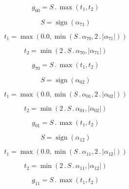 \documentclass{article}
\begin{document}
\begin{dmath}g_{60} = S \,.\, \max\left(t_{1}, t_{2}\right)\end{dmath}

\begin{dmath}S = \operatorname{sign}{\left (\alpha_{71} \right )}\end{dmath}

\begin{dmath}t_{1} = \max\left(0.0, \min\left(S \,.\, \alpha_{70}, 2 \,.\, \left|{\alpha_{71}}\right|\right)\right)\end{dmath}

\begin{dmath}t_{2} = \min\left(2 \,.\, S \,.\, \alpha_{70}, \left|{\alpha_{71}}\right|\right)\end{dmath}

\begin{dmath}g_{70} = S \,.\, \max\left(t_{1}, t_{2}\right)\end{dmath}

\begin{dmath}S = \operatorname{sign}{\left (\alpha_{02} \right )}\end{dmath}

\begin{dmath}t_{1} = \max\left(0.0, \min\left(S \,.\, \alpha_{01}, 2 \,.\, \left|{\alpha_{02}}\right|\right)\right)\end{dmath}

\begin{dmath}t_{2} = \min\left(2 \,.\, S \,.\, \alpha_{01}, \left|{\alpha_{02}}\right|\right)\end{dmath}

\begin{dmath}g_{01} = S \,.\, \max\left(t_{1}, t_{2}\right)\end{dmath}

\begin{dmath}S = \operatorname{sign}{\left (\alpha_{12} \right )}\end{dmath}

\begin{dmath}t_{1} = \max\left(0.0, \min\left(S \,.\, \alpha_{11}, 2 \,.\, \left|{\alpha_{12}}\right|\right)\right)\end{dmath}

\begin{dmath}t_{2} = \min\left(2 \,.\, S \,.\, \alpha_{11}, \left|{\alpha_{12}}\right|\right)\end{dmath}

\begin{dmath}g_{11} = S \,.\, \max\left(t_{1}, t_{2}\right)\end{dmath}
\end{document}
